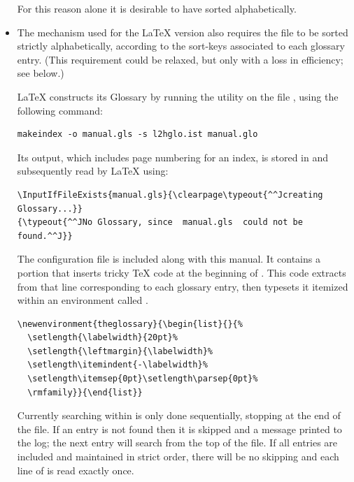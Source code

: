 \begin{itemize}
\noindent
For this reason alone it is desirable to have  sorted alphabetically.\par

\item
The mechanism used for the \LaTeX{} version also requires the file to be sorted
strictly alphabetically, according to the sort-keys associated to each glossary entry.
\newline
(This requirement could be relaxed, but only with a loss in efficiency; see below.)

\LaTeX{} constructs its Glossary by running the  utility 
on the file , using the following command:
%
\begin{small}%
\begin{verbatim}
makeindex -o manual.gls -s l2hglo.ist manual.glo
\end{verbatim}
\end{small}%
%
Its output, which includes page numbering for an index, is stored in 
and subsequently read by \LaTeX{} using:

\begin{small}%
\begin{verbatim}
\InputIfFileExists{manual.gls}{\clearpage\typeout{^^Jcreating Glossary...}}
{\typeout{^^JNo Glossary, since  manual.gls  could not be found.^^J}}
\end{verbatim}%
\end{small}%

\noindent
The configuration file  is included along with this manual.
It contains a portion that inserts tricky \TeX{} code at the beginning of .
This code extracts from  that line corresponding to each glossary entry, 
then typesets it itemized within an environment called .

\begin{small}%
\begin{verbatim}
\newenvironment{theglossary}{\begin{list}{}{%
  \setlength{\labelwidth}{20pt}%
  \setlength{\leftmargin}{\labelwidth}%
  \setlength\itemindent{-\labelwidth}%
  \setlength\itemsep{0pt}\setlength\parsep{0pt}%
  \rmfamily}}{\end{list}}
\end{verbatim}
\end{small}%
%
Currently searching within  is only done sequentially, stopping
at the end of the file. If an entry is not found then it is skipped and a message
printed to the log; the next entry will search from the top of the file.
If all entries are included and maintained in strict order, there will be no skipping 
and each line of  is read exactly once.\par


\end{itemize}
